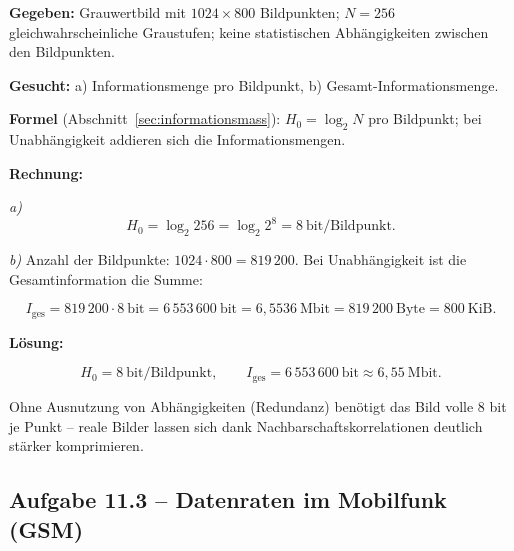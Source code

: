 \begin{beispiel}

\textbf{Gegeben:} Grauwertbild mit $1024 \times 800$ Bildpunkten;
$N = 256$ gleichwahrscheinliche Graustufen; keine statistischen
Abhängigkeiten zwischen den Bildpunkten.

\textbf{Gesucht:} a) Informationsmenge pro Bildpunkt, b) Gesamt-Informationsmenge.

\textbf{Formel} (Abschnitt~\ref{sec:informationsmass}): $H_0 = \log_2 N$ pro
Bildpunkt; bei Unabhängigkeit addieren sich die Informationsmengen.

\textbf{Rechnung:}

\emph{a)}
$$
H_0 = \log_2 256 = \log_2 2^8 = 8\ \text{bit/Bildpunkt}.
$$

\emph{b)} Anzahl der Bildpunkte: $1024 \cdot 800 = 819\,200$. Bei Unabhängigkeit
ist die Gesamtinformation die Summe:

$$
I_{\text{ges}} = 819\,200 \cdot 8\ \text{bit} = 6\,553\,600\ \text{bit}
= 6{,}5536\ \text{Mbit} = 819\,200\ \text{Byte} = 800\ \text{KiB}.
$$

\textbf{Lösung:}

$$
\boxed{\;H_0 = 8\ \text{bit/Bildpunkt}, \qquad
I_{\text{ges}} = 6\,553\,600\ \text{bit} \approx 6{,}55\ \text{Mbit}.\;}
$$

Ohne Ausnutzung von Abhängigkeiten (Redundanz) benötigt das Bild volle
$8$ bit je Punkt -- reale Bilder lassen sich dank Nachbarschaftskorrelationen
deutlich stärker komprimieren.

\end{beispiel}

\subsection*{Aufgabe 11.3 – Datenraten im Mobilfunk (GSM)}

